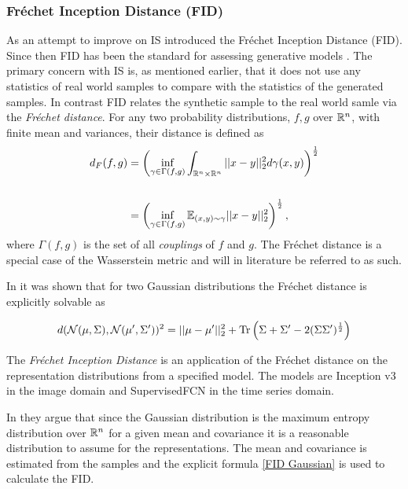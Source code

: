\documentclass[../../thesis.tex]{subfiles}
\begin{document}
\subsubsection{Fréchet Inception Distance (FID)}
As an attempt to improve on IS \cite{heusel2018gans} introduced the Fréchet Inception Distance (FID). Since then FID has been the standard for assessing generative models \cite{borji2021pros}.\newline
The primary concern with IS is, as mentioned earlier, that it does not use any statistics of real world samples to compare with the statistics of the generated samples. In contrast FID relates the synthetic sample to the real world samle via the \textit{Fréchet distance}. For any two probability distributions, $f,g$ over $\mathbb{R}^n$, with finite mean and variances, their  distance is defined as 
\begin{equation}
    \begin{aligned}
        d_F(f,g) &= \left(\inf_{\gamma \in \Gamma(f,g)} \int_{\mathbb{R}^n\times\mathbb{R}^n}||x-y||_2^2d\gamma(x,y) \right)^{\frac{1}{2}}\\\\
            &= \left(\inf_{\gamma \in \Gamma(f,g)} \mathbb{E}_{(x,y)\sim \gamma} ||x-y||_2^2\right)^{\frac{1}{2}},
    \end{aligned}
\end{equation}
where $\Gamma(f,g)$ is the set of all \textit{couplings} of $f$ and $g$. The Fréchet distance is a special case of the Wasserstein metric and will in literature be referred to as such.\newline 

In \cite{DOWSON1982450} it was shown that for two Gaussian distributions the Fréchet distance is explicitly solvable as

\begin{equation}
    \label{eq:FID Gaussian}
    d(\mathcal{N}(\mu,\Sigma),\mathcal{N}(\mu',\Sigma'))^2 = ||\mu-\mu'||_2^2 + \operatorname{Tr} \left( \Sigma + \Sigma' - 2(\Sigma\Sigma')^{\frac12}\right)
\end{equation}

The \textit{Fréchet Inception Distance} is an application of the Fréchet distance on the representation distributions from a specified model. The models are Inception v3 in the image domain and SupervisedFCN in the time series domain.\newline

In \cite{heusel2018gans} they argue that since the Gaussian distribution is the maximum entropy distribution over $\mathbb{R}^n$ for a given mean and covariance it is a reasonable distribution to assume for the representations. The mean and covariance is estimated from the samples and the explicit formula \ref{FID Gaussian} is used to calculate the FID. \newline
\end{document}
